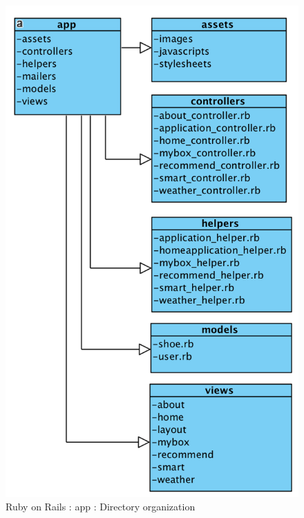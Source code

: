 \documentclass[conference]{IEEEtran}
\begin{document}
\begin{figure}[H]
\begin{center}
    \includegraphics[scale=0.65]{app}
  \caption{Ruby on Rails : app : Directory organization}\label{fig:label}
\end{center}
\end{figure}
\end{document}
